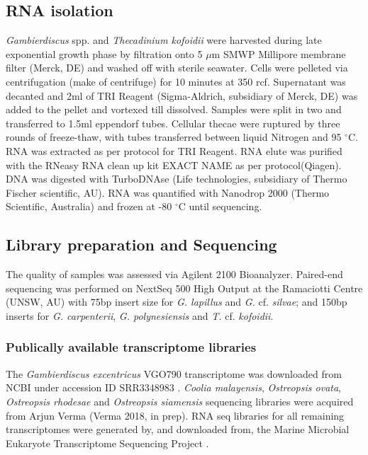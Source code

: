 \documentclass[12pt]{article}
\begin{document}
 \subsection*{RNA isolation}
\emph{Gambierdiscus} spp. and \emph{Thecadinium kofoidii} were harvested during late exponential growth phase by filtration onto 5 $\mu$m SMWP Millipore membrane filter (Merck, DE) and washed off with sterile seawater. 
Cells were pelleted via centrifugation (make of centrifuge) for 10 minutes at 350 rcf. 
Supernatant was decanted and 2ml of TRI Reagent (Sigma-Aldrich, subsidiary of Merck, DE) was added to the pellet and vortexed till dissolved. 
Samples were split in two and transferred to 1.5ml eppendorf tubes. 
Cellular thecae were ruptured by three rounds of freeze-thaw, with tubes transferred between liquid Nitrogen and 95 $^{\circ}$C. 
RNA was extracted as per protocol for TRI Reagent. 
RNA elute was purified with the RNeasy RNA clean up kit EXACT NAME as per protocol(Qiagen). 
DNA was digested with TurboDNAse (Life technologies, subsidiary of Thermo Fischer scientific, AU). 
RNA was quantified with Nanodrop 2000 (Thermo Scientific, Australia) and frozen at -80 $^{\circ}$C until sequencing.
 
\subsection*{Library preparation and Sequencing}
The quality of samples was assessed via Agilent 2100 Bioanalyzer. 
Paired-end sequencing was performed on NextSeq 500 High Output at the Ramaciotti Centre (UNSW, AU) with 75bp insert size for \emph{G. lapillus} and \emph{G.} cf. \emph{silvae}; and 150bp inserts for \emph{G. carpenterii}, \emph{G. polynesiensis} and \emph{T.} cf. \emph{kofoidii}.
\subsubsection*{Publically available transcriptome libraries}
The \emph{Gambierdiscus excentricus} VGO790 transcriptome was downloaded from NCBI under accession ID SRR3348983 \cite{kohli2017role}. 
\textit{Coolia malayensis}, \textit{Ostreopsis ovata}, \textit{Ostreopsis rhodesae} and \textit{Ostreopsis siamensis} sequencing libraries were acquired from Arjun Verma (Verma 2018, in prep). 
RNA seq libraries for all remaining transcriptomes were generated by, and downloaded from, the Marine Microbial Eukaryote Transcriptome Sequencing Project \citep{keeling2014marine}.
\end{document}
